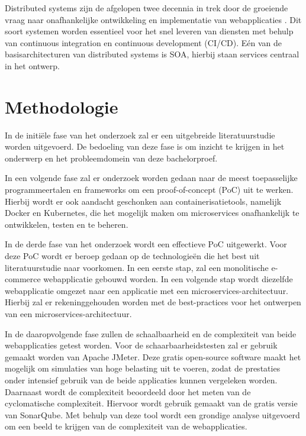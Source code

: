 Distributed systems zijn de afgelopen twee decennia in trek door de groeiende vraag naar onafhankelijke ontwikkeling en implementatie van webapplicaties \autocite{Raj2021}. Dit soort systemen worden essentieel voor het snel leveren van diensten met behulp van continuous integration en continuous development (CI/CD). Eén van de basisarchitecturen van distributed systems is SOA, hierbij staan services centraal in het ontwerp.



\section{Methodologie}%
\label{sec:methodologie}

In de initiële fase van het onderzoek zal er een uitgebreide literatuurstudie worden uitgevoerd. De bedoeling van deze fase is om inzicht te krijgen in het onderwerp en het probleemdomein van deze bachelorproef.

In een volgende fase zal er onderzoek worden gedaan naar de meest toepasselijke programmeertalen en frameworks om een proof-of-concept (PoC) uit te werken. Hierbij wordt er ook aandacht geschonken aan containerisatietools, namelijk Docker en Kubernetes, die het mogelijk maken om microservices onafhankelijk te ontwikkelen, testen en te beheren.

In de derde fase van het onderzoek wordt een effectieve PoC uitgewerkt. Voor deze PoC wordt er beroep gedaan op de technologieën die het best uit literatuurstudie naar voorkomen. In een eerste stap, zal een monolitische e-commerce webapplicatie gebouwd worden. In een volgende stap wordt diezelfde webapplicatie omgezet naar een applicatie met een microservices-architectuur. Hierbij zal er rekeninggehouden worden met de best-practices voor het ontwerpen van een microservices-architectuur.

In de daaropvolgende fase zullen de schaalbaarheid en de complexiteit van beide webapplicaties getest worden. Voor de schaarbaarheidstesten zal er gebruik gemaakt worden van Apache JMeter. Deze gratis open-source software maakt het mogelijk om simulaties van hoge belasting uit te voeren, zodat de prestaties onder intensief gebruik van de beide applicaties kunnen vergeleken worden. Daarnaast wordt de complexiteit beoordeeld door het meten van de cyclomatische complexiteit. Hiervoor wordt gebruik gemaakt van de gratis versie van SonarQube. Met behulp van deze tool wordt een grondige analyse uitgevoerd om een beeld te krijgen van de complexiteit van de webapplicaties.

